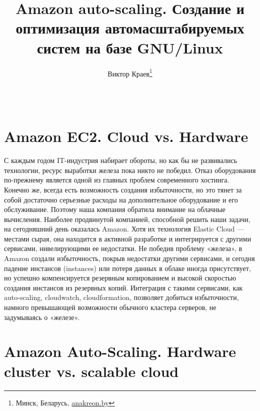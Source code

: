 \documentclass[10pt, a5paper]{article}
\begin{document}
\title{Amazon auto-scaling. Создание и оптимизация автомасштабируемых систем на базе GNU/Linux}
\author{Виктор Краев\footnote{Минск, Беларусь, \url{anakreon.by}}}
\date{}
\maketitle
\begin{abstract}
~
\end{abstract}

\section*{Amazon EC2. Cloud vs. Hardware}
С каждым годом IT-индустрия набирает обороты, но как бы не развивались технологии, ресурс выработки железа пока никто не победил. Отказ оборудования по-прежнему является одной из главных проблем современного хостинга. Конечно же, всегда есть возможность создания избыточности, но это тянет за собой достаточно серьезные расходы на дополнительное оборудование и его обслуживание. Поэтому наша компания обратила внимание на облачные вычисления. Наиболее продвинутой компанией, способной решить наши задачи, на сегодняшний день оказалась Amazon. Хотя их технология Elastic Cloud --- местами сырая, она находится в активной разработке и интегрируется с другими сервисами, нивелирующими ее недостатки. Не победив проблему «железа», в Amazon создали избыточность, покрыв недостатки другими сервисами, и сегодня падение инстансов (instances) или потеря данных в облаке иногда присутствует, но успешно компенсируется резервным копированием и высокой скоростью создания инстансов из резервных копий. Интеграция с такими сервисами, как auto-scaling, cloudwatch, cloudformation, позволяет добиться избыточности, намного превышающей возможности обычного кластера серверов, не задумываясь о «железе».  

\section*{Amazon Auto-Scaling. Hardware cluster vs. scalable cloud}
\end{document}
